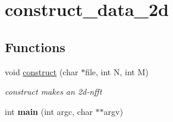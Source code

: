 \hypertarget{group__applications__mri2d__construct__data__2d}{
\section{construct\_\-data\_\-2d}
\label{group__applications__mri2d__construct__data__2d}
}
\subsection*{Functions}
\begin{CompactItemize}
\item 
\hypertarget{group__applications__mri2d__construct__data__2d_ga0}{
void \hyperlink{group__applications__mri2d__construct__data__2d_ga0}{construct} (char $\ast$file, int N, int M)}
\label{group__applications__mri2d__construct__data__2d_ga0}

\begin{CompactList}\small\item\em construct makes an 2d-nfft \item\end{CompactList}\item 
\hypertarget{group__applications__mri2d__construct__data__2d_ga1}{
int {\bf main} (int argc, char $\ast$$\ast$argv)}
\label{group__applications__mri2d__construct__data__2d_ga1}

\end{CompactItemize}
